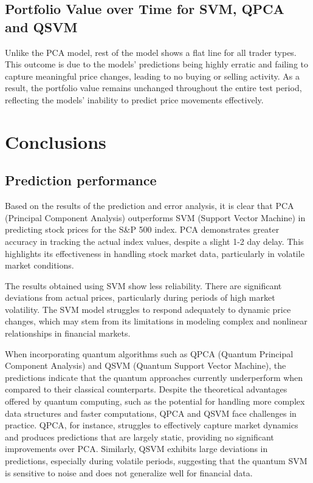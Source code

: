 \documentclass[journal]{IEEEtran}
\begin{document}
\subsection{Portfolio Value over Time for SVM, QPCA and QSVM}

Unlike the PCA model, rest of the model shows a flat line for all trader types. This outcome is due to the models' predictions being highly erratic and failing to capture meaningful price changes, leading to no buying or selling activity. As a result, the portfolio value remains unchanged throughout the entire test period, reflecting the models' inability to predict price movements effectively.

\section{Conclusions}

\subsection{Prediction performance}

Based on the results of the prediction and error analysis, it is clear that PCA (Principal Component Analysis) outperforms SVM (Support Vector Machine) in predicting stock prices for the S\&P 500 index. PCA demonstrates greater accuracy in tracking the actual index values, despite a slight 1-2 day delay. This highlights its effectiveness in handling stock market data, particularly in volatile market conditions.

The results obtained using SVM show less reliability. There are significant deviations from actual prices, particularly during periods of high market volatility. The SVM model struggles to respond adequately to dynamic price changes, which may stem from its limitations in modeling complex and nonlinear relationships in financial markets.

When incorporating quantum algorithms such as QPCA (Quantum Principal Component Analysis) and QSVM (Quantum Support Vector Machine), the predictions indicate that the quantum approaches currently underperform when compared to their classical counterparts. Despite the theoretical advantages offered by quantum computing, such as the potential for handling more complex data structures and faster computations, QPCA and QSVM face challenges in practice. QPCA, for instance, struggles to effectively capture market dynamics and produces predictions that are largely static, providing no significant improvements over PCA. Similarly, QSVM exhibits large deviations in predictions, especially during volatile periods, suggesting that the quantum SVM is sensitive to noise and does not generalize well for financial data.
\end{document}
